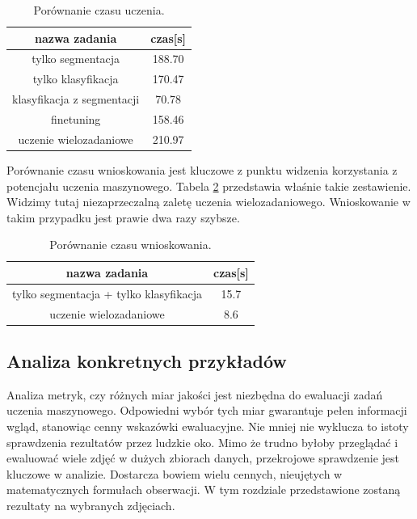 \begin{table}[ht!]
    \centering
    \begin{tabular}{c|c}
        nazwa zadania                      &   czas{[}s{]} \\ \hline
        tylko segmentacja                  &   188.70 \\
        tylko klasyfikacja                &   170.47 \\
        klasyfikacja z segmentacji   &   70.78 \\
        finetuning                        &   158.46 \\
        uczenie wielozadaniowe                   &   210.97 
\end{tabular}
\caption{Porównanie czasu uczenia.}
\label{tab:acc-por}
\end{table}

Porównanie czasu wnioskowania jest kluczowe z punktu widzenia korzystania z potencjału uczenia maszynowego. Tabela \ref{tab:por-infer} przedstawia właśnie takie zestawienie. Widzimy tutaj niezaprzeczalną zaletę uczenia wielozadaniowego. Wnioskowanie w takim przypadku jest prawie dwa razy szybsze.

\begin{table}[ht!]
    \centering
    \begin{tabular}{c|c}
        nazwa zadania                      &   czas{[}s{]} \\ \hline
        tylko segmentacja + tylko klasyfikacja                  &   15.7\\
        uczenie wielozadaniowe                   &   8.6
\end{tabular}
\caption{Porównanie czasu wnioskowania.}
\label{tab:por-infer}
\end{table}

\subsection{Analiza konkretnych przykładów}
Analiza metryk, czy różnych miar jakości jest niezbędna do ewaluacji zadań uczenia maszynowego. Odpowiedni wybór tych miar gwarantuje pełen informacji wgląd, stanowiąc cenny wskazówki ewaluacyjne. Nie mniej nie wyklucza to istoty sprawdzenia rezultatów przez ludzkie oko. Mimo że trudno byłoby przeglądać i ewaluować wiele zdjęć w dużych zbiorach danych, przekrojowe sprawdzenie jest kluczowe w analizie. Dostarcza bowiem wielu cennych, nieujętych w matematycznych formułach obserwacji. W tym rozdziale przedstawione zostaną rezultaty na wybranych zdjęciach.

